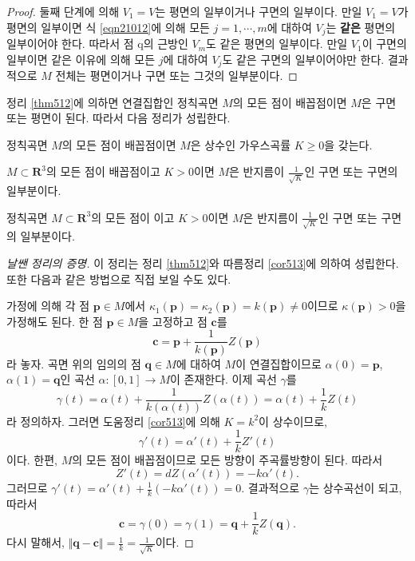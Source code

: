 \begin{proof}
둘째 단계에 의해 $V_1 = V$는 평면의 일부이거나 구면의 일부이다. 만일 $V_1 = V$가 평면의 일부이면 식 \eqref{eqn21012}에 의해
모든 $j = 1, \cdots, m$에 대하여 $V_j$는 \textbf{같은} 평면의 일부이어야 한다.
따라서 점 $\mathrm{q}$의 근방인 $V_m$도 같은 평면의 일부이다.
만일 $V_1$이 구면의 일부이면 같은 이유에 의해 모든 $j$에 대하여
$V_j$도 같은 구면의 일부이어야만 한다. 결과적으로 $M$ 전체는
평면이거나 구면 또는 그것의 일부분이다.
\end{proof}


정리 \ref{thm512}에 의하면 연결집합인 정칙곡면
 $M$의 모든 점이 배꼽점이면 $M$은 구면 또는 평면이 된다. 따라서
다음 정리가 성립한다.

\begin{cor}\label{cor513}
정칙곡면 $M$의 모든 점이 배꼽점이면 $M$은 상수인 가우스곡률
$K \ge 0$을 갖는다.
\end{cor}

\begin{thm}[정칙곡면과 구의 관계]\label{thm514}
 $M \subset  \mathbf{R}^3$의 모든 점이 배꼽점이고
$K > 0$이면 $M$은 반지름이 $\displaystyle \frac{1}{\sqrt K}$인 구면 또는
구면의 일부분이다.
\end{thm}

\begin{cor}\label{surface}
정칙곡면 $M \subset  \mathbf{R}^3$의 모든 점이 이고
$K > 0$이면 $M$은 반지름이 $\displaystyle \frac{1}{\sqrt K}$인 구면 또는
구면의 일부분이다.
\end{cor}

\begin{proof}[날쌘 정리의 증명]
이 정리는 정리 \ref{thm512}와 따름정리 \ref{cor513}에 의하여 성립한다.
또한 다음과 같은 방법으로 직접 보일 수도  있다.

가정에 의해 각 점 $\mathbf{p}\in M$에서
$\kappa_1(\mathbf{p}) = \kappa_2( \mathbf{p}) = k(\mathbf{p}) \ne 0$이므로
$\kappa(\mathbf{p}) > 0$을 가정해도 된다.
한 점 $\mathbf{p} \in M$을 고정하고 점 $\mathbf{c}$를
\[
\mathbf{c} = \mathbf{p} + \frac{1}{k(\mathbf{p})}
Z(\mathbf{p})
\]
라 놓자. 곡면 위의 임의의 점 $\mathbf{q}\in M$에 대하여 $M$이
연결집합이므로
$\alpha(0) = \mathbf{p}$, $\alpha(1) = \mathbf{q}$인 곡선
$\alpha : [0, 1] \to M$이 존재한다. 이제 곡선 $\gamma$를
\[
\gamma(t) = \alpha(t) + \frac{1}{k(\alpha(t))} Z(\alpha(t)) =
\alpha(t) + \frac 1k Z(t)
\]
라 정의하자. 그러면 도움정리 \ref{cor513}에 의해 $K = k^2$이
상수이므로,
\[
\gamma'(t) = \alpha'(t) + \frac 1k Z'(t)
\]
이다. 한편, $M$의 모든 점이 배꼽점이므로 모든 방향이
주곡률방향이 된다. 따라서
\[
Z'(t) = dZ(\alpha'(t)) = -k \alpha'(t).
\]
그러므로 $\displaystyle \gamma'(t) = \alpha'(t) +
\frac 1k (-k \alpha'(t)) = 0.$
결과적으로
$\gamma$는 상수곡선이 되고, 따라서
\[
\mathbf{c} = \gamma(0) = \gamma(1) = \mathbf{q} +
\frac 1k Z(\mathbf{q}).
\]
다시 말해서, $\displaystyle \Vert \mathbf{q} - \mathbf{c}\Vert = \frac 1k =
\frac{1}{\sqrt K}$이다.
\end{proof}

